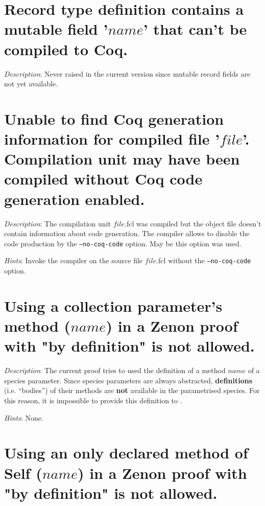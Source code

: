 \section*{Record type definition contains a mutable field '$name$' that can't
  be compiled to Coq.}

{\em Description}: {\color{red} Never raised in the current version
  since mutable record fields are not yet available}.



\section*{Unable to find Coq generation information for compiled file
  '$file$'. Compilation unit may have been compiled without Coq code
  generation enabled.}

{\em Description}: The {\focal} compilation unit $file$.fcl was
compiled but the object file doesn't contain information about {\coq}
code generation. The {\focal} compiler allows to disable the {\coq} code
production by the {\tt --no-coq-code} option. May be this option was
used.

{\em Hints}: Invoke the compiler on the source file $file$.fcl without
the {\tt --no-coq-code} option.



\section*{Using a collection parameter's method ($name$) in a Zenon proof
  with "by definition" is not allowed.}

{\em Description}: The current proof tries to used the definition of a
method $name$ of a species parameter. Since species parameters are
always abstracted, {\bf definitions} (i.e. ``bodies'') of their methods
are {\bf not} available in the parametrised species. For this reason,
it is impossible to provide this definition to {\zenon}.

{\em Hints}: None.



\section*{Using an only declared method of Self ($name$) in a Zenon
  proof with "by definition" is not allowed.}

